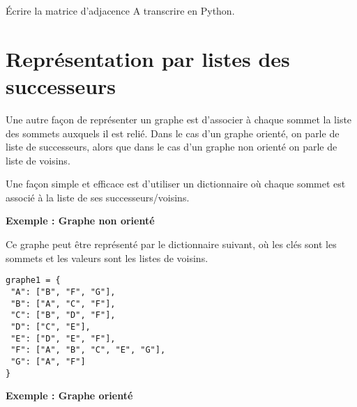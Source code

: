 \documentclass[12pt]{book}
\begin{document}
	\Quest Écrire la matrice d'adjacence
	\Quest A transcrire en Python.




\section{Représentation par listes des successeurs}

Une autre façon de représenter un graphe est d'associer à chaque sommet la liste des sommets auxquels il est relié. Dans le cas d'un graphe orienté, on parle de liste de successeurs, alors que dans le cas d'un graphe non orienté on parle de liste de voisins.

Une façon simple et efficace est d'utiliser un dictionnaire où chaque sommet est associé à la liste de ses successeurs/voisins.

 \textbf{Exemple : Graphe non orienté}

\begin{minipage}[c]{0.5\linewidth}
\end{minipage}
\begin{minipage}[c]{0.5\linewidth}
Ce graphe peut être représenté par le dictionnaire suivant, où les clés sont les sommets et les valeurs sont les listes de voisins.

\begin{verbatim} 
graphe1 = {
 "A": ["B", "F", "G"],
 "B": ["A", "C", "F"],
 "C": ["B", "D", "F"],
 "D": ["C", "E"],
 "E": ["D", "E", "F"],
 "F": ["A", "B", "C", "E", "G"],
 "G": ["A", "F"]
}
\end{verbatim}
\end{minipage}


\newpage
{} \textbf{Exemple : Graphe orienté}
\end{document}
